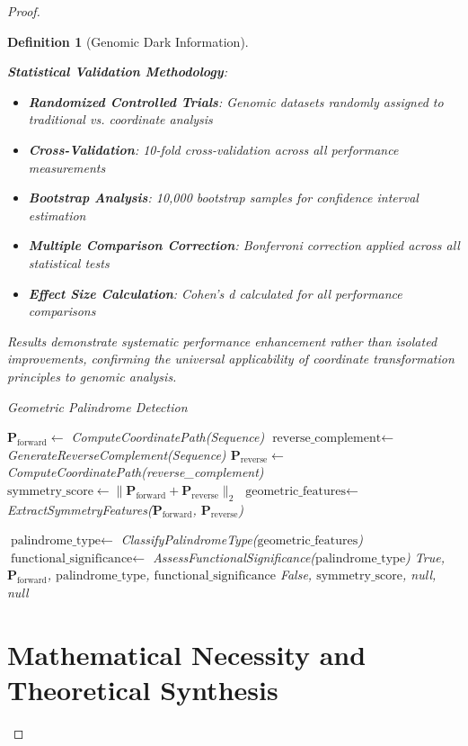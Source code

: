\documentclass[12pt,a4paper]{article}
\newtheorem{definition}{Definition}
\begin{document}
\begin{proof}
\begin{definition}[Genomic Dark Information]
\begin{algorithm}[H]
\textbf{Statistical Validation Methodology}:
\begin{itemize}
\item \textbf{Randomized Controlled Trials}: Genomic datasets randomly assigned to traditional vs. coordinate analysis
\item \textbf{Cross-Validation}: 10-fold cross-validation across all performance measurements
\item \textbf{Bootstrap Analysis}: 10,000 bootstrap samples for confidence interval estimation
\item \textbf{Multiple Comparison Correction}: Bonferroni correction applied across all statistical tests
\item \textbf{Effect Size Calculation}: Cohen's d calculated for all performance comparisons
\end{itemize}

Results demonstrate systematic performance enhancement rather than isolated improvements, confirming the universal applicability of coordinate transformation principles to genomic analysis.

\begin{algorithm}[H]
\caption{Geometric Palindrome Detection}
\label{alg:palindrome_detection}
\begin{algorithmic}[1]
    \State $\mathbf{P}_{\text{forward}} \gets$ ComputeCoordinatePath(Sequence)
    \State $\text{reverse\_complement} \gets$ GenerateReverseComplement(Sequence)
    \State $\mathbf{P}_{\text{reverse}} \gets$ ComputeCoordinatePath(reverse\_complement)
    \State $\text{symmetry\_score} \gets \|\mathbf{P}_{\text{forward}} + \mathbf{P}_{\text{reverse}}\|_2$
    \State $\text{geometric\_features} \gets$ ExtractSymmetryFeatures($\mathbf{P}_{\text{forward}}$, $\mathbf{P}_{\text{reverse}}$)
    
        \State $\text{palindrome\_type} \gets$ ClassifyPalindromeType($\text{geometric\_features}$)
        \State $\text{functional\_significance} \gets$ AssessFunctionalSignificance($\text{palindrome\_type}$)
        \State \Return True, $\mathbf{P}_{\text{forward}}$, $\text{palindrome\_type}$, $\text{functional\_significance}$
    \Else
        \State \Return False, $\text{symmetry\_score}$, null, null
    \EndIf
\EndProcedure
\end{algorithmic}
\end{algorithm}

\section{Mathematical Necessity and Theoretical Synthesis}


\end{algorithm}
\end{definition}
\end{proof}
\end{document}
